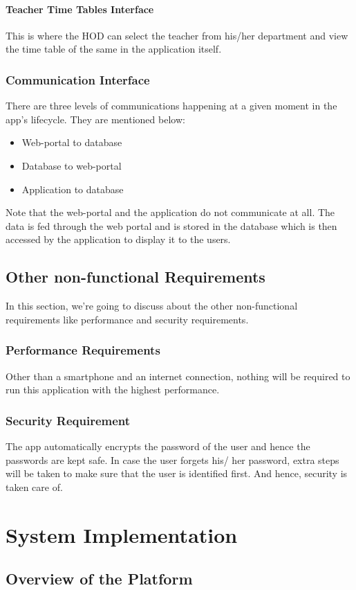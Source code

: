\documentclass[BTech]{srmuthesis}
\begin{document}
\subsubsection{Teacher Time Tables Interface}
This is where the HOD can select the teacher from his/her department and view the time table of the same in the application itself.
\subsection{Communication Interface}
There are three levels of communications happening at a given moment in the app's lifecycle. They are mentioned below:
\begin{itemize}
\item Web-portal to database
\item Database to web-portal
\item Application to database
\end{itemize}
Note that the web-portal and the application do not communicate at all. The data is fed through the web portal and is stored in the database which is then accessed by the application to display it to the users. 
\section{Other non-functional Requirements}
In this section, we're going to discuss about the other non-functional requirements like performance and security requirements. 
\subsection{Performance Requirements}
Other than a smartphone and an internet connection, nothing will be required to run this application with the highest performance.
\subsection{Security Requirement}
The app automatically encrypts the password of the user and hence the passwords are kept safe. In case the user forgets his/ her password, extra steps will be taken to make sure that the user is identified first. And hence, security is taken care of.
\chapter{System Implementation}
\section{Overview of the Platform}
\end{document}

